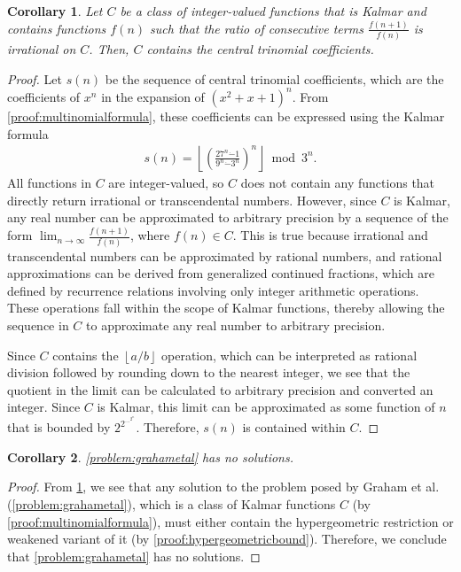 \documentclass[10pt,a4paper]{article}
\theoremstyle{plain}
\newtheorem{corollary}{Corollary}[section]
\newcommand{\floor}[1]{\left\lfloor #1 \right\rfloor}
\begin{document}
\begin{corollary} \label{proof:trinomialnoclass}
Let $C$ be a class of integer-valued functions that is Kalmar and contains functions $f(n)$ such that the ratio of consecutive terms $\frac{f(n+1)}{f(n)}$ is irrational on $C$. Then, $C$ contains the central trinomial coefficients.
\end{corollary}
\begin{proof}
Let $s(n)$ be the sequence of central trinomial coefficients, which are the coefficients of $x^n$ in the expansion of $(x^2+x+1)^n$. From \cref{proof:multinomialformula}, these coefficients can be expressed using the Kalmar formula
\begin{align*}
s(n) = \floor{\left(\frac{27^n \dot{-} 1}{9^n \dot{-} 3^n}\right)^n} \bmod 3^n .
\end{align*}
All functions in $C$ are integer-valued, so $C$ does not contain any functions that directly return irrational or transcendental numbers. However, since $C$ is Kalmar, any real number can be approximated to arbitrary precision by a sequence of the form $\lim_{n \to \infty} \frac{f(n+1)}{f(n)}$, where $f(n) \in C$. This is true because irrational and transcendental numbers can be approximated by rational numbers, and rational approximations can be derived from generalized continued fractions, which are defined by recurrence relations involving only integer arithmetic operations. These operations fall within the scope of Kalmar functions, thereby allowing the sequence in $C$ to approximate any real number to arbitrary precision.

Since $C$ contains the $\floor{a/b}$ operation, which can be interpreted as rational division followed by rounding down to the nearest integer, we see that the quotient in the limit can be calculated to arbitrary precision and converted an integer. Since $C$ is Kalmar, this limit can be approximated as some function of $n$ that is bounded by $2^{2^{...^{2^n}}}$. Therefore, $s(n)$ is contained within $C$.
\end{proof}

\begin{corollary}
\cref{problem:grahametal} has no solutions.
\end{corollary}
\begin{proof}
From \cref{proof:trinomialnoclass}, we see that any solution to the problem posed by Graham et al. (\cref{problem:grahametal}), which is a class of Kalmar functions $C$ (by \cref{proof:multinomialformula}), must either contain the hypergeometric restriction or weakened variant of it (by \cref{proof:hypergeometricbound}). Therefore, we conclude that \cref{problem:grahametal} has no solutions.
\end{proof}
\end{document}

